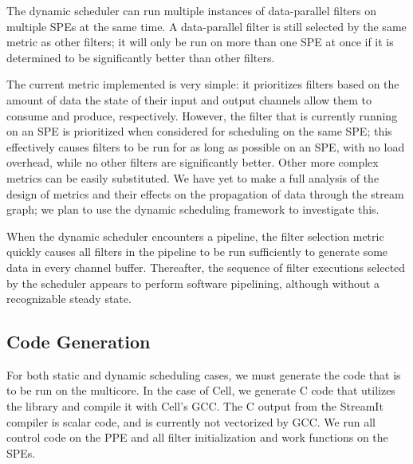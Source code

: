 The dynamic scheduler can run multiple instances of data-parallel
filters on multiple SPEs at the same time. A data-parallel filter is
still selected by the same metric as other filters; it will only be
run on more than one SPE at once if it is determined to be significantly better than
other filters.

The current metric implemented is very simple: it prioritizes filters
based on the amount of data the state of their input and output
channels allow them to consume and produce, respectively. However, the
filter that is currently running on an SPE is prioritized when
considered for scheduling on the same SPE; this effectively causes
filters to be run for as long as possible on an SPE, with no load
overhead, while no other filters are significantly better. Other more
complex metrics can be easily substituted. We have yet to make a
full analysis of the design of metrics and their effects on the propagation
of data through the stream graph; we plan to use the dynamic scheduling
framework to investigate this.

When the dynamic scheduler encounters a pipeline, the filter selection
metric quickly causes all filters in the pipeline to be run
sufficiently to generate some data in every channel
buffer. Thereafter, the sequence of filter executions selected by the
scheduler appears to perform software pipelining, although without a
recognizable steady state.

\subsection{Code Generation}

For both static and dynamic scheduling cases, we must generate the
code that is to be run on the multicore. In the case of Cell, we
generate C code that utilizes the library and compile it with Cell's
GCC. The C output from the StreamIt compiler is scalar code, and is
currently not vectorized by GCC. We run all control code on the PPE
and all filter initialization and work functions on the SPEs.

